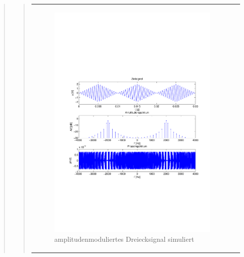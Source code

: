 \begin{quote}
\begin{quote}
\begin{center}
\begin{tabular}{ll}
            \hspace{-10em}
                \begin{minipage}{0.6\textwidth}

                    \begin{figure}[H]
                        \label{fig:}
                        \includegraphics[scale=0.5, trim = 2cm 6.5cm 1.5cm
                        8.5cm, clip]{./Bilder/Dreieckmodsimuliert} %
                        \caption{amplitudenmoduliertes Dreiecksignal simuliert}
                    \end{figure}

                \end{minipage}
                \begin{minipage}{0.6\textwidth}


\end{minipage}
\end{tabular}
\end{center}
\end{quote}
\end{quote}
